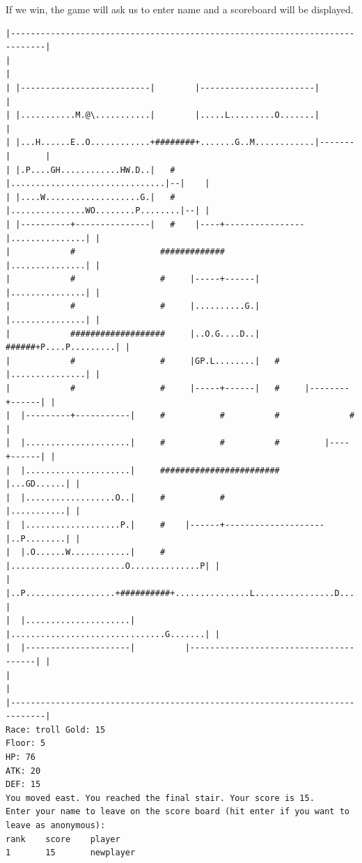 \documentclass[11pt]{article}
\theoremstyle{plain}
\begin{document}
\vspace{0.2 in}
If we win, the game will ask us to enter name and a scoreboard will be displayed.
\begin{Verbatim}[fontsize=\scriptsize]
|-----------------------------------------------------------------------------|
|                                                                             |
| |--------------------------|        |-----------------------|               |
| |...........M.@\...........|        |.....L.........O.......|               |
| |...H......E..O............+########+.......G..M............|-------|       |
| |.P....GH............HW.D..|   #    |...............................|--|    |
| |....W...................G.|   #    |...............WO........P........|--| |
| |----------+---------------|   #    |----+----------------|...............| |
|            #                 #############                |...............| |
|            #                 #     |-----+------|         |...............| |
|            #                 #     |..........G.|         |...............| |
|            ###################     |..O.G....D..|   ######+P....P.........| |
|            #                 #     |GP.L........|   #     |...............| |
|            #                 #     |-----+------|   #     |--------+------| |
|  |---------+-----------|     #           #          #              #        |
|  |.....................|     #           #          #         |----+------| |
|  |.....................|     ########################         |...GD......| |
|  |..................O..|     #           #                    |...........| |
|  |...................P.|     #    |------+--------------------|..P........| |
|  |.O......W............|     #    |.......................O..............P| |
|  |..P..................+##########+...............L................D......| |
|  |.....................|          |...............................G.......| |
|  |---------------------|          |---------------------------------------| |
|                                                                             |
|-----------------------------------------------------------------------------|
Race: troll Gold: 15                                                   Floor: 5
HP: 76
ATK: 20
DEF: 15
You moved east. You reached the final stair. Your score is 15. 
Enter your name to leave on the score board (hit enter if you want to leave as anonymous):
rank    score    player  
1       15       newplayer
\end{Verbatim}
\end{document}
